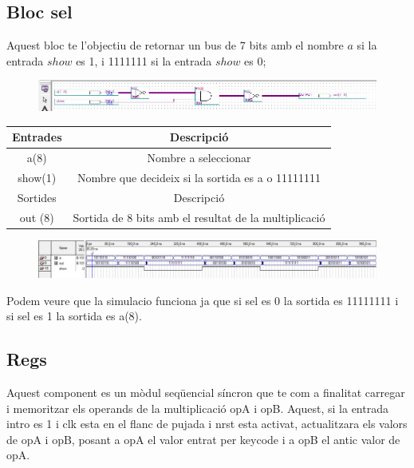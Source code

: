 \documentclass[12pt, a4papre]{article}
\begin{document}
	\subsection{Bloc sel}
	
	Aquest bloc te l'objectiu de retornar un bus de 7 bits amb el nombre $a$ si la entrada $show$ es 1, i 1111111 si la entrada $show$ es 0;
	\begin{figure}[H]
		\begin{center}
		\includegraphics[width=130mm]{SEL.jpeg}
		\end{center}
	\end{figure}
	
	\begin{table}[h!]
		\centering
		 \begin{tabular}{|c | c|} 
			 \hline
			 Entrades & Descripció\\ [0.5ex] 
			 \hline
			 a(8) &  Nombre a seleccionar\\ 
			 show(1) &  Nombre que decideix si la sortida es a o 11111111\\ 
			 \hline\hline
			 Sortides & Descripció\\ [0.5ex] 
			 \hline
			out (8) & Sortida de 8 bits amb el resultat de la multiplicació\\ 
			 \hline
		 \end{tabular}
	\end{table}
	
	\begin{figure}[H]
		\begin{center}
		\includegraphics[width=130mm]{Simulacio_Sel.jpeg}
		\end{center}
	\end{figure}
	
	Podem veure que la simulacio funciona ja que si sel es 0 la sortida es 11111111 i si sel es 1 la sortida es a(8).
	
	\subsection{Regs}
	
	Aquest component es un mòdul seqüencial síncron que te com a finalitat carregar i memoritzar els operands de la multiplicació opA i opB. Aquest, si la entrada intro es 1 i clk esta en el flanc de pujada i nrst esta activat, actualitzara els valors de opA i opB, posant a opA el valor entrat per keycode i a opB el antic valor de opA.
	
\end{document}
